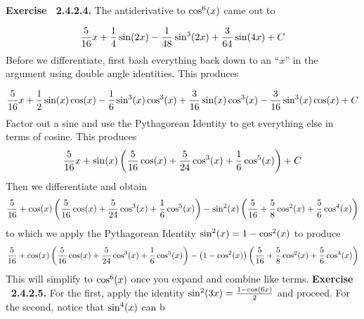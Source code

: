  {\noindent \protect \bf  Exercise ~2.4.2.4.} The antiderivative to $\protect \qopname  \relax o{cos}^6(x)$ came out to \par $$\protect \frac  {5}{16}x+\protect \frac  {1}{4}\protect \qopname  \relax o{sin}(2x)-\protect \frac  {1}{48}\protect \qopname  \relax o{sin}^3(2x)+\protect \frac  {3}{64}\protect \qopname  \relax o{sin}(4x)+C$$ Before we differentiate, first bash everything back down to an ``$x$'' in the argument using double angle identities. This produces \par $$\protect \frac  {5}{16}x+\protect \frac  {1}{2}\protect \qopname  \relax o{sin}(x)\protect \qopname  \relax o{cos}(x)-\protect \frac  {1}{6}\protect \qopname  \relax o{sin}^3(x)\protect \qopname  \relax o{cos}^3(x)+\protect \frac  {3}{16}\protect \qopname  \relax o{sin}(x)\protect \qopname  \relax o{cos}^3(x)-\protect \frac  {3}{16}\protect \qopname  \relax o{sin}^3(x)\protect \qopname  \relax o{cos}(x)+C$$ Factor out a sine and use the Pythagorean Identity to get everything else in terms of cosine. This produces $$\protect \frac  {5}{16}x+\protect \qopname  \relax o{sin}(x)\left (\protect \frac  {5}{16}\protect \qopname  \relax o{cos}(x)+\protect \frac  {5}{24}\protect \qopname  \relax o{cos}^3(x)+\protect \frac  {1}{6}\protect \qopname  \relax o{cos}^5(x)\right )+C$$ Then we differentiate and obtain $$\protect \frac  {5}{16}+\protect \qopname  \relax o{cos}(x)\left (\protect \frac  {5}{16}\protect \qopname  \relax o{cos}(x)+\protect \frac  {5}{24}\protect \qopname  \relax o{cos}^3(x)+\protect \frac  {1}{6}\protect \qopname  \relax o{cos}^5(x)\right )-\protect \qopname  \relax o{sin}^2(x)\left (\protect \frac  {5}{16}+\protect \frac  {5}{8}\protect \qopname  \relax o{cos}^2(x)+\protect \frac  {5}{6}\protect \qopname  \relax o{cos}^4(x)\right )$$ to which we apply the Pythagorean Identity $\protect \qopname  \relax o{sin}^2(x)=1-\protect \qopname  \relax o{cos}^2(x)$ to produce $$\protect \frac  {5}{16}+\protect \qopname  \relax o{cos}(x)\left (\protect \frac  {5}{16}\protect \qopname  \relax o{cos}(x)+\protect \frac  {5}{24}\protect \qopname  \relax o{cos}^3(x)+\protect \frac  {1}{6}\protect \qopname  \relax o{cos}^5(x)\right )-\left (1-\protect \qopname  \relax o{cos}^2(x)\right )\left (\protect \frac  {5}{16}+\protect \frac  {5}{8}\protect \qopname  \relax o{cos}^2(x)+\protect \frac  {5}{6}\protect \qopname  \relax o{cos}^4(x)\right )$$ This will simplify to $\protect \qopname  \relax o{cos}^6(x)$ once you expand and combine like terms.  \protect \newline  \protect \newline  
 {\noindent \protect \bf  Exercise ~2.4.2.5.} For the first, apply the identity $\protect \qopname  \relax o{sin}^2(3x)=\protect \frac  {1-\protect \qopname  \relax o{cos}(6x)}{2}$ and proceed. For the second, notice that $\protect \qopname  \relax o{sin}^4(x)$ can b